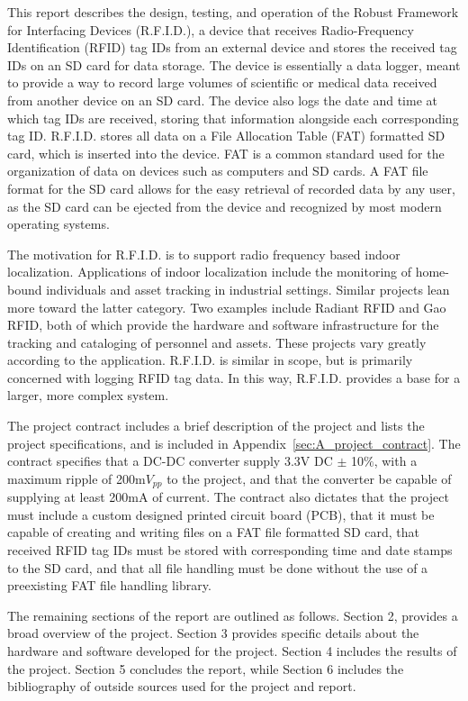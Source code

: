 This report describes the design, testing, and operation of the Robust Framework for Interfacing Devices (R.F.I.D.), a device that receives Radio-Frequency Identification (RFID) tag IDs from an external device and stores the received tag IDs on an SD card for data storage. The device is essentially a data logger, meant to provide a way to record large volumes of scientific or medical data received from another device on an SD card. The device also logs the date and time at which tag IDs are received, storing that information alongside each corresponding tag ID. R.F.I.D. stores all data on a File Allocation Table (FAT) formatted SD card, which is inserted into the device. FAT is a common standard used for the organization of data on devices such as computers and SD cards. A FAT file format for the SD card allows for the easy retrieval of recorded data by any user, as the SD card can be ejected from the device and recognized by most modern operating systems.



The motivation for R.F.I.D. is to support radio frequency based indoor localization. Applications of indoor localization include the monitoring of home-bound individuals and asset tracking in industrial settings. Similar projects lean more toward the latter category. Two examples include Radiant RFID and Gao RFID, both of which provide the hardware and software infrastructure for the tracking and cataloging of personnel and assets. These projects vary greatly according to the application. R.F.I.D. is similar in scope, but is primarily concerned with logging RFID tag data. In this way, R.F.I.D. provides a base for a larger, more complex system.

The project contract includes a brief description of the project and lists the project specifications, and is included in Appendix~\ref{sec:A_project_contract}. The contract specifies that a DC-DC converter supply 3.3V DC $\pm$ 10$\%$, with a maximum ripple of 200m$V_{pp}$ to the project, and that the converter be capable of supplying at least 200mA of current. The contract also dictates that the project must include a custom designed printed circuit board (PCB), that it must be capable of creating and writing files on a FAT file formatted SD card, that received RFID tag IDs must be stored with corresponding time and date stamps to the SD card, and that all file handling must be done without the use of a preexisting FAT file handling library.

The remaining sections of the report are outlined as follows. Section 2, provides a broad overview of the project. Section 3 provides specific details about the hardware and software developed for the project. Section 4 includes the results of the project. Section 5 concludes the report, while Section 6 includes the bibliography of outside sources used for the project and report.


